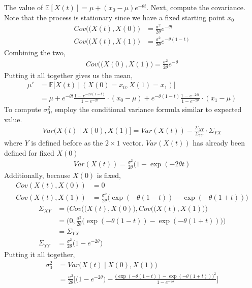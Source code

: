 \documentclass{article}
\newcommand{\EX}{\mathbb{E}}
\begin{document}
The value of $\EX[X(t)]=\mu+(x_0-\mu)e^{-\theta t}$. Next, compute the covariance. Note that the process is stationary since we have a fixed starting point $x_0$
\begin{align*}
    Cov\Big((X(t),X(0)\Big)&=\frac{\sigma^2}{2\theta}e^{-\theta t}\\
    Cov\Big((X(t),X(1)\Big)&=\frac{\sigma^2}{2\theta}e^{-\theta (1-t)}
\end{align*}
Combining the two,
\begin{align*}
    Cov\Big((X(0),X(1)\Big)=\frac{\sigma^2}{2\theta}e^{-\theta}
\end{align*}
Putting it all together gives us the mean,
\begin{align*}
    \mu'&=\EX\Big[X(t)~\Big|~(X(0)=x_0,X(1)=x_1)\Big]\\
    &=\mu+e^{-\theta t}\frac{1-e^{-2\theta(1-t)}}{1-e^{-2\theta}}\cdot (x_0-\mu)+e^{-\theta (1-t)}\frac{1-e^{-2\theta t}}{1-e^{-2\theta}}\cdot (x_1-\mu)
\end{align*}
To compute $\sigma_0^2$, employ the conditional variance formula similar to expected value.
\begin{align*}
    Var(X(t)~|~X(0),X(1)]=Var(X(t))-\frac{\Sigma_{XY}}{\Sigma_{YY}}\cdot \Sigma_{YX}
\end{align*}
where $Y$ is defined before as the $2\times 1$ vector. $Var(X(t))$ has already been defined for fixed $X(0)$
\begin{align*}
    Var(X(t))=\frac{\sigma^2}{2\theta}(1-\exp(-2\theta t)
\end{align*}
Additionally, because $X(0)$ is fixed,
\begin{align*}
    Cov(X(t),X(0))&=0\\
    Cov(X(t),X(1))&=\frac{\sigma^2}{2\theta}\Big(\exp(-\theta(1-t))-\exp(-\theta(1+t))\Big)
\end{align*}
\begin{align*}
    \Sigma_{XY}&=\Bigg(Cov\Big((X(t),X(0)\Big),Cov\Big((X(t),X(1)\Big)\Bigg)\\
    &=\Bigg(0,\frac{\sigma^2}{2\theta}\Big(\exp(-\theta(1-t))-\exp(-\theta(1+t))\Big)\Bigg)\\
    &=\Sigma_{YX}\\
    \Sigma_{YY}&=\frac{\sigma^2}{2\theta}\Big(1-e^{-2\theta }\Big)
\end{align*}
Putting it all together,
\begin{align*}
    \sigma_0^2&=Var\Big(X(t)~|~X(0),X(1)\Big)\\
    &=\frac{\sigma^2}{2\theta}\Bigg[\Big(1-e^{-2\theta }\Big)-\frac{\Big(\exp(-\theta(1-t))-\exp(-\theta(1+t))\Big)^2}{1-e^{-2\theta}}\Bigg]
\end{align*}
\end{document}
